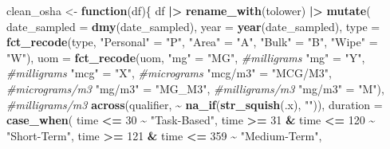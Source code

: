 \documentclass[
]{article}
\newenvironment{Shaded}{\begin{snugshade}}{\end{snugshade}}
\newcommand{\AttributeTok}[1]{\textcolor[rgb]{0.13,0.29,0.53}{#1}}
\newcommand{\CommentTok}[1]{\textcolor[rgb]{0.56,0.35,0.01}{\textit{#1}}}
\newcommand{\ControlFlowTok}[1]{\textcolor[rgb]{0.13,0.29,0.53}{\textbf{#1}}}
\newcommand{\DecValTok}[1]{\textcolor[rgb]{0.00,0.00,0.81}{#1}}
\newcommand{\FunctionTok}[1]{\textcolor[rgb]{0.13,0.29,0.53}{\textbf{#1}}}
\newcommand{\NormalTok}[1]{#1}
\newcommand{\OtherTok}[1]{\textcolor[rgb]{0.56,0.35,0.01}{#1}}
\newcommand{\SpecialCharTok}[1]{\textcolor[rgb]{0.81,0.36,0.00}{\textbf{#1}}}
\newcommand{\StringTok}[1]{\textcolor[rgb]{0.31,0.60,0.02}{#1}}
\begin{document}
\begin{Shaded}
\begin{Highlighting}[]
\NormalTok{clean\_osha }\OtherTok{\textless{}{-}} \ControlFlowTok{function}\NormalTok{(df)\{}
\NormalTok{  df }\SpecialCharTok{|\textgreater{}} 
    \FunctionTok{rename\_with}\NormalTok{(tolower) }\SpecialCharTok{|\textgreater{}} 
  \FunctionTok{mutate}\NormalTok{(}
    \AttributeTok{date\_sampled =} \FunctionTok{dmy}\NormalTok{(date\_sampled), }
    \AttributeTok{year =} \FunctionTok{year}\NormalTok{(date\_sampled), }
         \AttributeTok{type =} \FunctionTok{fct\_recode}\NormalTok{(type,}
                          \StringTok{"Personal"} \OtherTok{=} \StringTok{"P"}\NormalTok{,}
                          \StringTok{"Area"} \OtherTok{=} \StringTok{"A"}\NormalTok{,}
                          \StringTok{"Bulk"} \OtherTok{=} \StringTok{"B"}\NormalTok{, }
                          \StringTok{"Wipe"} \OtherTok{=} \StringTok{"W"}\NormalTok{),  }
    \AttributeTok{uom =} \FunctionTok{fct\_recode}\NormalTok{(uom,}
                          \StringTok{"mg"} \OtherTok{=} \StringTok{"MG"}\NormalTok{, }\CommentTok{\#milligrams}
                          \StringTok{"mg"} \OtherTok{=} \StringTok{"Y"}\NormalTok{, }\CommentTok{\#milligrams}
                          \StringTok{"mcg"} \OtherTok{=} \StringTok{"X"}\NormalTok{, }\CommentTok{\#micrograms}
                          \StringTok{"mcg/m3"} \OtherTok{=} \StringTok{"MCG/M3"}\NormalTok{, }\CommentTok{\#micrograms/m3}
                          \StringTok{"mg/m3"} \OtherTok{=} \StringTok{"MG\_M3"}\NormalTok{, }\CommentTok{\#milligrams/m3}
                          \StringTok{"mg/m3"} \OtherTok{=} \StringTok{"M"}\NormalTok{), }\CommentTok{\#milligrams/m3}
    \FunctionTok{across}\NormalTok{(qualifier, }\SpecialCharTok{\textasciitilde{}} \FunctionTok{na\_if}\NormalTok{(}\FunctionTok{str\_squish}\NormalTok{(.x), }\StringTok{""}\NormalTok{)),}
    \AttributeTok{duration =} \FunctionTok{case\_when}\NormalTok{(}
\NormalTok{  time }\SpecialCharTok{\textless{}=} \DecValTok{30}                  \SpecialCharTok{\textasciitilde{}} \StringTok{"Task{-}Based"}\NormalTok{,}
\NormalTok{  time }\SpecialCharTok{\textgreater{}=} \DecValTok{31}  \SpecialCharTok{\&}\NormalTok{ time }\SpecialCharTok{\textless{}=} \DecValTok{120}   \SpecialCharTok{\textasciitilde{}} \StringTok{"Short{-}Term"}\NormalTok{,}
\NormalTok{  time }\SpecialCharTok{\textgreater{}=} \DecValTok{121} \SpecialCharTok{\&}\NormalTok{ time }\SpecialCharTok{\textless{}=} \DecValTok{359}   \SpecialCharTok{\textasciitilde{}} \StringTok{"Medium{-}Term"}\NormalTok{,}

\end{Highlighting}
\end{Shaded}
\end{document}
